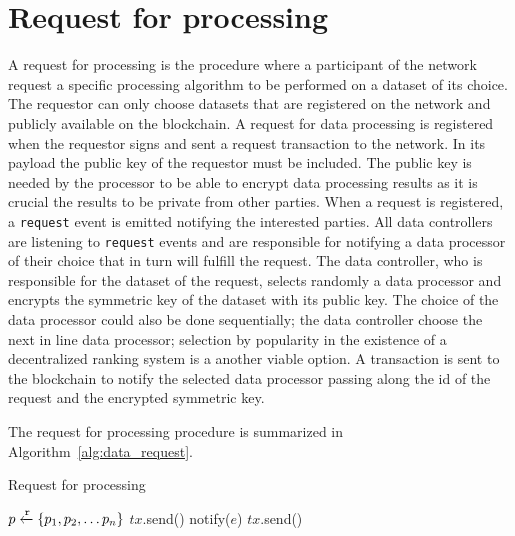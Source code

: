 \section{Request for processing}
\label{solution:flow:pr_req}

A request for processing is the procedure where a participant of the network request a specific processing algorithm to be performed on a dataset of its choice. The requestor can only choose datasets that are registered on the network and publicly available on the blockchain. A request for data processing is registered when the requestor signs and sent a request transaction to the network. In its payload the public key of the requestor must be included. The public key is needed by the processor to be able to encrypt data processing results as it is crucial the results to be private from other parties. When a request is registered, a \verb|request| event is emitted notifying the interested parties. All data controllers are listening to \verb|request| events and are responsible for notifying a data processor of their choice that in turn will fulfill the request. The data controller, who is responsible for the dataset of the request, selects randomly a data processor and encrypts the symmetric key of the dataset with its public key. The choice of the data processor could also be done sequentially; the data controller choose the next in line data processor; selection by popularity in the existence of a decentralized ranking system is a another viable option. A transaction is sent to the blockchain to notify the selected data processor passing along the id of the request and the encrypted symmetric key.

The request for processing procedure is summarized in Algorithm~\ref{alg:data_request}.

\begin{algorithm}[!htb]
  \caption{Request for processing}\label{alg:data_request}
  \begin{algorithmic}[1]
    \State $p \xleftarrow{\mathtt{r}} \{ p_1, p_2, \dots p_n \}$ 
     
     
     
    \State $tx$.send()
    \State {}
  \EndFunction
     
        \State notify($e$) 
      \EndIf
    \EndWhile
  \EndProcedure
     
    \State $tx$.send()
    \State {}
  \EndProcedure
  \end{algorithmic}
\end{algorithm}

